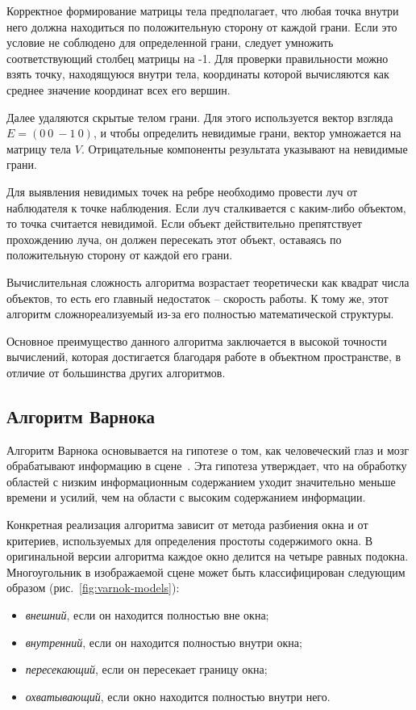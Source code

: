 Корректное формирование матрицы тела предполагает, что любая точка внутри него должна находиться по положительную сторону от каждой грани. Если это условие не соблюдено для определенной грани, следует умножить соответствующий столбец матрицы на -1. Для проверки правильности можно взять точку, находящуюся внутри тела, координаты которой вычисляются как среднее значение координат всех его вершин.

Далее удаляются скрытые телом грани. Для этого используется вектор взгляда $E = (0 \ 0 \ -1 \ 0)$, и чтобы определить невидимые грани, вектор умножается на матрицу тела $V$. Отрицательные компоненты результата указывают на невидимые грани.

Для выявления невидимых точек на ребре необходимо провести луч от наблюдателя к точке наблюдения. Если луч сталкивается с каким-либо объектом, то точка считается невидимой. Если объект действительно препятствует прохождению луча, он должен пересекать этот объект, оставаясь по положительную сторону от каждой его грани.

Вычислительная сложность алгоритма возрастает теоретически как квадрат числа объектов, то есть его главный недостаток -- скорость работы. К тому же, этот алгоритм сложнореализуемый из-за его полностью математической структуры.

Основное преимущество данного алгоритма заключается в высокой точности вычислений, которая достигается благодаря работе в объектном пространстве, в отличие от большинства других алгоритмов.

\subsection{Алгоритм Варнока}

Алгоритм Варнока основывается на гипотезе о том, как человеческий глаз и мозг обрабатывают информацию в сцене~\cite{lit3, lit4}. Эта гипотеза утверждает, что на обработку областей с низким информационным содержанием уходит значительно меньше времени и усилий, чем на области с высоким содержанием информации.

Конкретная реализация алгоритма зависит от метода разбиения окна и от критериев, используемых для определения простоты содержимого окна. В оригинальной версии алгоритма каждое окно делится на четыре равных подокна. Многоугольник в изображаемой сцене может быть классифицирован следующим образом (рис.~\ref{fig:varnok-models}):
\begin{itemize}[label=--]
	\item \textit{внешний}, если он находится полностью вне окна;
	\item \textit{внутренний}, если он находится полностью внутри окна;
	\item \textit{пересекающий}, если он пересекает границу окна;
	\item \textit{охватывающий}, если окно находится полностью внутри него.
\end{itemize}

